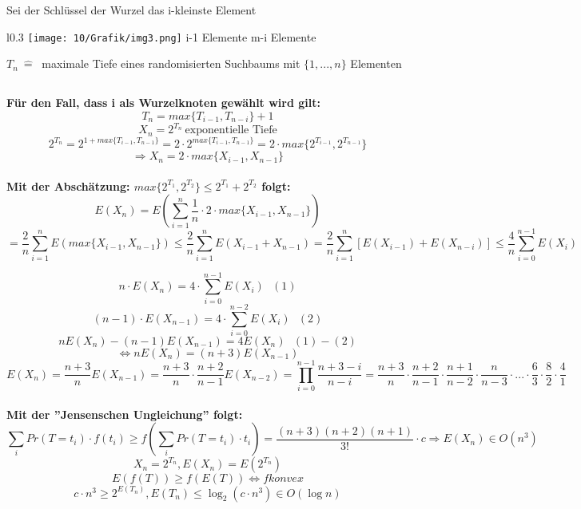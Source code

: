 Sei der Schlüssel der Wurzel das i-kleinste Element \\

\begin{wrapfigure}[2]{l}{0.3\linewidth}
	\vspace{-50pt}
\texttt{[image: 10/Grafik/img3.png]}
\noindent i-1 Elemente \hfill \hfill m-i Elemente
\caption{}
\end{wrapfigure}

\vspace{30pt}
$T_n ~\hat{=}~$ maximale Tiefe eines randomisierten Suchbaums mit $\{1,...,n\}$ Elementen\\
\vspace{50pt}


\pagebreak

\subsection*{}
\textbf{Für den Fall, dass i als Wurzelknoten gewählt wird gilt:}
\[T_n=max\{T_{i-1}, T_{n-i}\}+1\]
\[X_n = 2^{T_n} ~ \text{exponentielle Tiefe}\]
\[2^{T_n} = 2^{1+max\{T_{i-1}, T_{n-1}\}} = 2 \cdot 2^{max\{T_{i-1}, T_{n-1}\}} = 2 \cdot max\{2^{T_{i-1}}, 2^{T_{n-1}}\}\]
\[\Rightarrow X_n = 2 \cdot max\{X_{i-1}, X_{n-1}\} \] \\

\textbf{Mit der Abschätzung: $max\{2^{T_1}, 2^{T_2}\} \leq 2^{T_1} + 2^{T_2}$ folgt:}
\[E(X_n) = E \left(\sum^n_{i=1} \frac{1}{n} \cdot  2 \cdot max\{X_{i-1}, X_{n-1}\} \right) \]
\[= \frac{2}{n} \sum^n_{i=1} E \left(max\{X_{i-1}, X_{n-1}\} \right) \leq \frac{2}{n} \sum^n_{i=1} E \left(X_{i-1} + X_{n-1} \right) = \frac{2}{n} \sum^n_{i=1} \left[E(X_{i-1}) + E(X_{n-i}) \right] \leq \frac{4}{n} \sum^{n-1}_{i=0} E(X_i)\] 

\[ n \cdot E(X_n) = 4 \cdot \sum^{n-1}_{i=0} E(X_i) ~~~(1)\]
\[ (n-1) \cdot E(X_{n-1}) = 4 \cdot \sum^{n-2}_{i=0} E(X_i) ~~~(2)\]
\[ nE(X_n) - (n-1)E(X_{n-1}) = 4E(X_n) ~~~(1)-(2)\]
\[\Leftrightarrow nE(X_n) = (n+3)E(X_{n-1})\]
\[E(X_n)=\frac{n+3}{n}E(X_{n-1})=\frac{n+3}{n} \cdot \frac{n+2}{n-1}E(X_{n-2}) = \prod^{n-1}_{i=0} \frac{n+3-i}{n-i} = \frac{n+3}{n} \cdot \frac{n+2}{n-1} \cdot \frac{n+1}{n-2} \cdot \frac{n}{n-3} \cdot ... \cdot \frac{6}{3} \cdot \frac{8}{2} \cdot \frac{4}{1} \]\\

\textbf{Mit der ''Jensenschen Ungleichung'' folgt:}
\[ \sum_i Pr(T=t_i) \cdot f(t_i) \geq f\left(\sum_i Pr(T=t_i) \cdot t_i\right) = \frac{ (n+3)(n+2)(n+1) } { 3!}  \cdot c \Rightarrow E(X_n) \in O(n^3)\]
\[X_n = 2^{T_n},  E(X_n) = E(2^{T_n}) \]
\[E(f(T)) \geq f(E(T)) \Leftrightarrow f konvex\]
\[c \cdot n^3 \geq 2^{E(T_n)}, E(T_n) \leq \log_2(c \cdot n^3) \in O(\log n) \]

